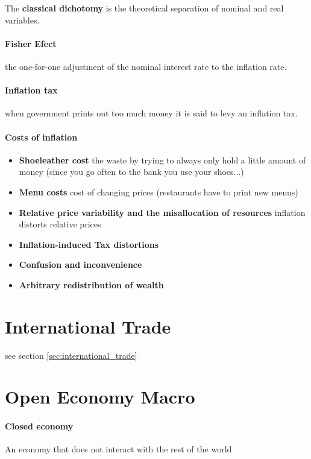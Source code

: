 \documentclass[a4paper,titlepage] {scrartcl}
\begin{document}
The \textbf{classical dichotomy} is the theoretical separation of nominal and real variables.

\paragraph{Fisher Efect} %
\label{par:fisher_efect}
the one-for-one adjustment of the nominal interest rate to the inflation rate.

\paragraph{Inflation tax} %
\label{par:inflation_tax}
when government prints out too much money it is said to levy an inflation tax.

\paragraph{Costs of inflation} %
\label{par:costs_of_inflation}
\begin{itemize}
	\item \textbf{Shoeleather cost} the waste by trying to always only hold a little amount of money (since you go often to the bank you use your shoes...)
	\item \textbf{Menu costs} cost of changing prices (restaurants have to print new menus)
	\item \textbf{Relative price variability and the misallocation of resources} inflation distorts relative prices
	\item \textbf{Inflation-induced Tax distortions}
	\item \textbf{Confusion and inconvenience}
	\item \textbf{Arbitrary redistribution of wealth}
\end{itemize}

\section{International Trade}
see section \ref{sec:international_trade}
\section{Open Economy Macro}

\paragraph{Closed economy} %
\label{par:closed_economy}
An economy that does not interact with the rest of the world
\end{document}
